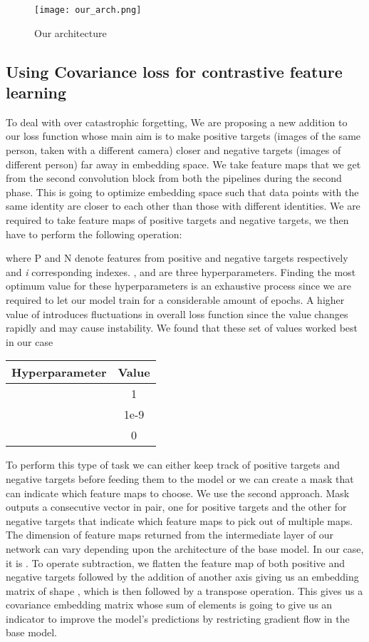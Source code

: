 \documentclass[10pt,twocolumn,letterpaper]{article}
\begin{document}
\begin{figure*}
\texttt{[image: our\_arch.png]}
\caption{Our architecture}
\end{figure*}

\subsection{Using Covariance loss for contrastive feature learning}

To deal with over catastrophic forgetting, We are proposing a new addition to our loss function whose main aim is to make positive targets (images of the same person, taken with a different camera) closer and negative targets (images of different person) far away in embedding space. We take feature maps that we get from the second convolution block from both the pipelines during the second phase. This is going to optimize embedding space such that data points with the same identity are closer to each other than those with different identities. We are required to take feature maps of positive targets and negative targets, we then have to perform the following operation:

where P and N denote features from positive and negative targets respectively and \textit{i} corresponding indexes.
,  and  are three hyperparameters. Finding the most optimum value for these hyperparameters is an exhaustive process since we are required to let our model train for a considerable amount of epochs. A higher value of  introduces fluctuations in overall loss function since the value changes rapidly and may cause instability. We found that these set of values worked best in our case 
\begin{center}
 \begin{tabular}{||c c||} 
 \hline
 Hyperparameter & Value \\ [0.5ex] 
 \hline\hline
  & 1 \\ 
 \hline
  & 1e-9 \\ 
 \hline
  & 0 \\ 
 \hline
\end{tabular}
\end{center}

To perform this type of task we can either keep track of positive targets and negative targets before feeding them to the model or we can create a mask that can indicate which feature maps to choose. We use the second approach. Mask outputs a consecutive vector in pair, one for positive targets and the other for negative targets that indicate which feature maps to pick out of multiple maps. The dimension of feature maps returned from the intermediate layer of our network can vary depending upon the architecture of the base model. In our case, it is . To operate subtraction, we flatten the feature map of both positive and negative targets followed by the addition of another axis giving us an embedding matrix of shape , which is then followed by a transpose operation.
This gives us a covariance embedding matrix whose sum of elements is going to give us an indicator to improve the model's predictions by restricting gradient flow in the base model.
\end{document}

